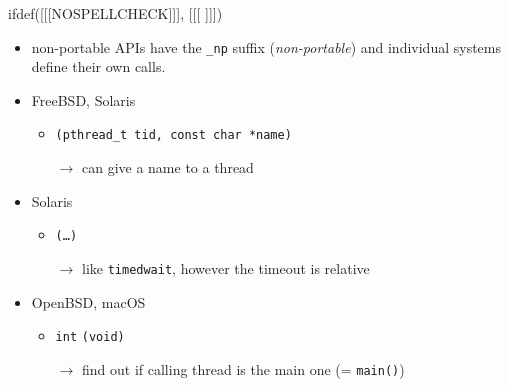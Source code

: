 
ifdef([[[NOSPELLCHECK]]], [[[
]]])

\begin{slide}

\begin{itemize}
\item non-portable APIs have the \texttt{\_np} suffix (\emph{non-portable}) and
individual systems define their own calls.

\item FreeBSD, Solaris
\begin{itemize}
\item {}\texttt{(pthread\_t tid, const char *name)}
\item[$\rightarrow$] can give a name to a thread
\end{itemize}

\item Solaris
\begin{itemize}
\item {}\texttt{(\dots)}
\item[$\rightarrow$] like \texttt{timedwait}, however the timeout is relative
\end{itemize}

\item OpenBSD, macOS
\begin{itemize}
\item \texttt{int} \texttt{(void)}
\item[$\rightarrow$] find out if calling thread is the main one
(= \texttt{main()})
\end{itemize}

\end{itemize}
\end{slide}

